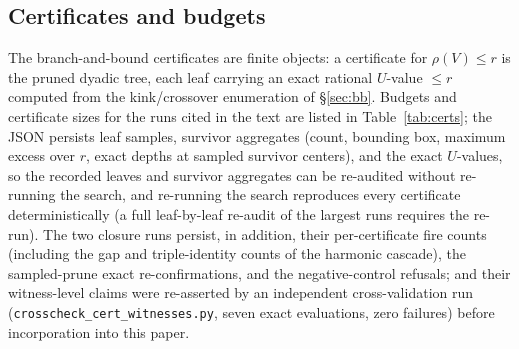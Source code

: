 \subsection{Certificates and budgets}

The branch-and-bound certificates are finite objects: a certificate for
$\rho(V)\le r$ is the pruned dyadic tree, each leaf carrying an exact
rational $U$-value $\le r$ computed from the kink/crossover enumeration
of \S\ref{sec:bb}. Budgets and certificate sizes for the runs cited in
the text are listed in Table~\ref{tab:certs}; the JSON persists leaf
samples, survivor aggregates (count, bounding box, maximum excess over
$r$, exact depths at sampled survivor centers), and the exact
$U$-values, so the recorded leaves and survivor aggregates can be
re-audited without re-running the search, and re-running the search
reproduces every certificate deterministically (a full leaf-by-leaf
re-audit of the largest runs requires the re-run).
The two closure runs persist, in addition, their per-certificate fire
counts (including the gap and triple-identity counts of the harmonic
cascade), the sampled-prune exact re-confirmations, and the
negative-control refusals; and their witness-level claims were
re-asserted by an independent cross-validation run
(\texttt{crosscheck\_cert\_witnesses.py}, seven exact evaluations,
zero failures) before incorporation into this paper.

